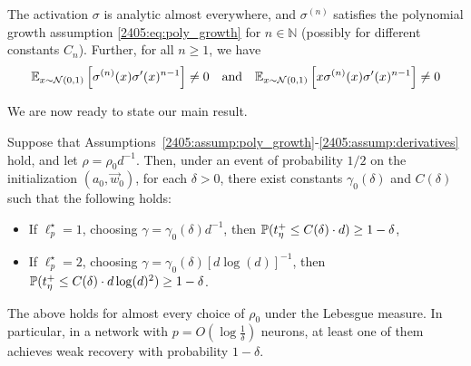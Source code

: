 \begin{assumption}\label{2405:assump:derivatives}
    The activation $\sigma$ is analytic almost everywhere, and $\sigma^{(n)}$ satisfies the polynomial growth assumption \eqref{2405:eq:poly_growth} for $n \in \mathbb{N}$ (possibly for different constants $C_n$). Further, for all $n \geq 1$, we have
    \[ \mathbb{E}_{x\sim\mathcal{N}(0, 1)}\left[\sigma^{(n)}(x) \sigma'(x)^{n-1}\right] \neq 0 \quad \text{and} \quad \mathbb{E}_{x\sim\mathcal{N}(0, 1)}\left[x \sigma^{(n)}(x) \sigma'(x)^{n-1}\right] \neq 0 \]
\end{assumption}

We are now ready to state our main result.
\begin{theorem}
\label{2405:thm:single_index_recovery}
    Suppose that Assumptions~\ref{2405:assump:poly_growth}-\ref{2405:assump:derivatives} hold, and let $\rho = \rho_0 d^{-1}$. Then, under an event of probability $1/2$ on the initialization $(a_0, \vec{w}_0)$, for each $\delta > 0$, there exist constants $\gamma_0(\delta)$ and $C(\delta)$ such that the following holds:
    \begin{itemize}
        \item If $\ell_p^\star = 1$, choosing $\gamma = \gamma_0(\delta)d^{-1}$, then
$
             \mathbb{P}(t^+_\eta \leq C(\delta) \cdot d) \geq 1 - \delta
     $,

        \item If $\ell_p^\star = 2$, choosing $\gamma = \gamma_0(\delta)[d\log(d)]^{-1}$, then 
        $
            \mathbb{P}(t^+_\eta \leq C(\delta) \cdot d \log(d)^2) \geq 1 - \delta
       $.
    \end{itemize}
    The above holds for almost every choice of $\rho_0$ under the Lebesgue measure. In particular, in a network with $p = O(\log\frac1\delta)$ neurons, at least one of them achieves weak recovery with probability $1 - \delta$.
\end{theorem}

